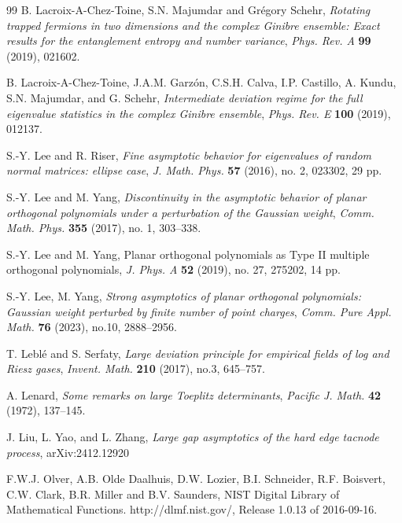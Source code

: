 \documentclass[reqno]{amsart}
\newcommand{\1}{\mathds{1}}
\numberwithin{equation}{section}
\theoremstyle{definition}
\begin{document}
\begin{thebibliography}{99}
 B. Lacroix-A-Chez-Toine, S.N. Majumdar and Gr\'{e}gory Schehr, \emph{Rotating trapped fermions in two dimensions and the complex Ginibre ensemble: Exact results for the entanglement entropy and number variance}, \textit{Phys. Rev. A} \textbf{99} (2019), 021602.

 B. Lacroix-A-Chez-Toine, J.A.M. Garz\'{o}n, C.S.H. Calva, I.P. Castillo, A. Kundu, S.N. Majumdar, and G. Schehr, \emph{Intermediate deviation regime for the full eigenvalue statistics in the complex Ginibre ensemble}, \textit{Phys. Rev. E} \textbf{100} (2019), 012137.



 S.-Y. Lee and R. Riser, \emph{Fine asymptotic behavior for eigenvalues of random normal matrices: ellipse case}, \textit{J. Math. Phys.} \textbf{57} (2016), no. 2, 023302, 29 pp. 

 S.-Y. Lee and M. Yang, \emph{Discontinuity in the asymptotic behavior of planar orthogonal polynomials under a perturbation of the Gaussian weight}, \textit{Comm. Math. Phys.} \textbf{355} (2017), no. 1, 303--338. 

 S.-Y. Lee and M. Yang, Planar orthogonal polynomials as Type II multiple orthogonal polynomials, \textit{J. Phys. A} \textbf{52} (2019), no. 27, 275202, 14 pp. 

 S.-Y. Lee, M. Yang, \emph{Strong asymptotics of planar orthogonal polynomials: Gaussian weight perturbed by finite number of point charges}, \textit{Comm. Pure Appl. Math.} \textbf{76} (2023), no.10, 2888--2956.


 T. Lebl\'{e} and S. Serfaty, \emph{Large deviation principle for empirical fields of log and Riesz gases}, \textit{Invent. Math.} \textbf{210} (2017), no.3, 645--757.


 A. Lenard, \emph{Some remarks on large Toeplitz determinants}, \textit{Pacific J. Math.} \textbf{42} (1972), 137--145. 



J. Liu, L. Yao, and L. Zhang, \emph{Large gap asymptotics of the hard edge tacnode process}, arXiv:2412.12920

 F.W.J. Olver, A.B. Olde Daalhuis, D.W. Lozier, B.I. Schneider, R.F. Boisvert, C.W. Clark, B.R. Miller and B.V. Saunders, NIST Digital Library of Mathematical Functions. http://dlmf.nist.gov/, Release 1.0.13 of 2016-09-16.


\end{thebibliography}
\end{document}
